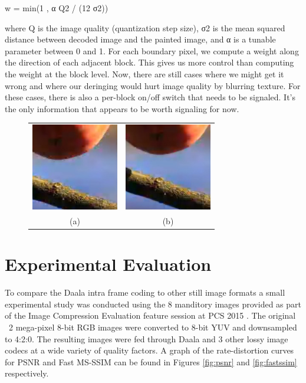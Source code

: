 \documentclass[conference, 10pt]{IEEEtran}
\begin{document}
w = min(1 , α Q2 / (12 σ2))

where Q is the image quality (quantization step size), σ2 is the mean squared distance between decoded image and the painted image, and α is a tunable parameter between 0 and 1. For each boundary pixel, we compute a weight along the direction of each adjacent block. This gives us more control than computing the weight at the block level. Now, there are still cases where we might get it wrong and where our deringing would hurt image quality by blurring texture. For these cases, there is also a per-block on/off switch that needs to be signaled. It's the only information that appears to be worth signaling for now.

\begin{figure}
\begin{center}
\begin{tabular}{c c}
  \includegraphics[natwidth=200,natheight=200,width=1.5in]{fruits_nopf.png} &
  \includegraphics[natwidth=200,natheight=200,width=1.5in]{fruits_pf.png} \\
  (a) & (b)
\end{tabular}
\end{center}
\caption[pvq]{\label{fig:dering} }
\end{figure}

\section{Experimental Evaluation}

To compare the Daala intra frame coding to other still image formats a small
 experimental study was conducted using the 8 manditory images provided as
 part of the Image Compression Evaluation feature session at PCS 2015
 \cite{pcs2015website}.
The original ~2 mega-pixel 8-bit RGB images were converted to 8-bit YUV and
 downsampled to 4:2:0.
The resulting images were fed through Daala and 3 other lossy image codecs
 at a wide variety of quality factors.
A graph of the rate-distortion curves for PSNR and Fast MS-SSIM can be found
 in Figures \ref{fig:psnr} and \ref{fig:fastssim} respectively.
\end{document}
